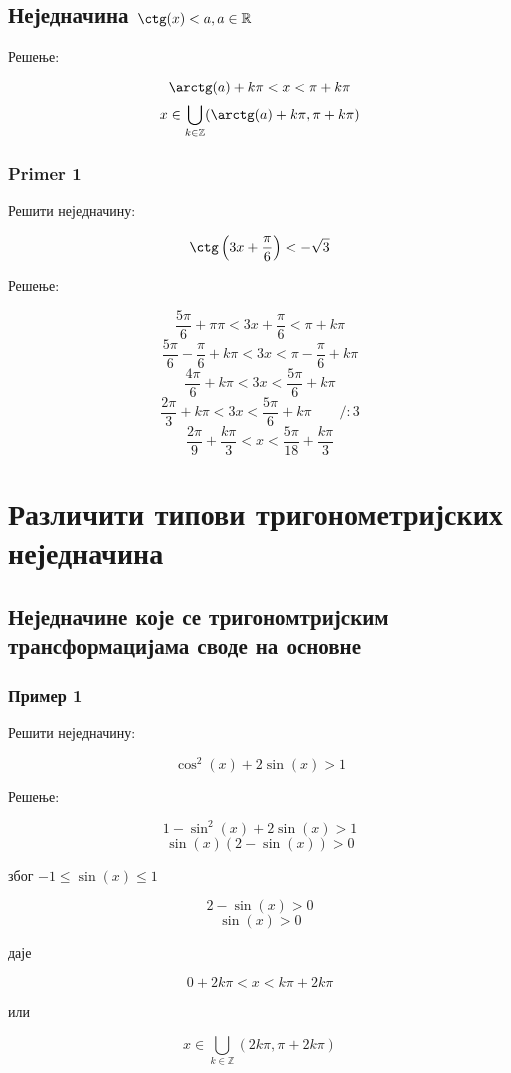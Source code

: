 \documentclass[a4paper,12pt]{article}
\begin{document}
\subsection{Неједначина $\ctg(x)<a,a\in\mathbb{R}$}

Решење:

\[\arctg(a)+k\pi<x<\pi+k\pi\]
\[x\in\bigcup_{k\in\mathbb{Z}}(\arctg(a)+k\pi,\pi+k\pi)\]

\subsubsection{Primer 1}

Решити неједначину:

\[\ctg\left(3x+\frac{\pi}{6}\right)<-\sqrt{3}\]

Решење:

\[\frac{5\pi}{6}+\pi\pi<3x+\frac{\pi}{6}<\pi+k\pi\]
\[\frac{5\pi}{6}-\frac{\pi}{6}+k\pi<3x<\pi-\frac{\pi}{6}+k\pi\]
\[\frac{4\pi}{6}+k\pi<3x<\frac{5\pi}{6}+k\pi\]
\[\frac{2\pi}{3}+k\pi<3x<\frac{5\pi}{6}+k\pi\qquad/:3\]
\[\frac{2\pi}{9}+\frac{k\pi}{3}<x<\frac{5\pi}{18}+\frac{k\pi}{3}\]


\newpage
\section{Различити типови тригонометријских неједначина}

\subsection{Неједначине које се тригономтријским трансформацијама своде на основне}

\subsubsection{Пример 1}

Решити неједначину:

\[\cos^{2}(x)+2\sin(x)>1\]

Решење:

\[1-\sin^{2}(x)+2\sin(x)>1\]
\[\sin(x)(2-\sin(x))>0\]
\centerline{због $-1\le\sin(x)\le1$}
\[2-\sin(x)>0\]
\[\sin(x)>0\]
\centerline{даје}
\[0+2k\pi<x<k\pi+2k\pi\]
\centerline{или}
\[x\in\bigcup_{k\in\mathbb{Z}}(2k\pi,\pi+2k\pi)\]
\end{document}
